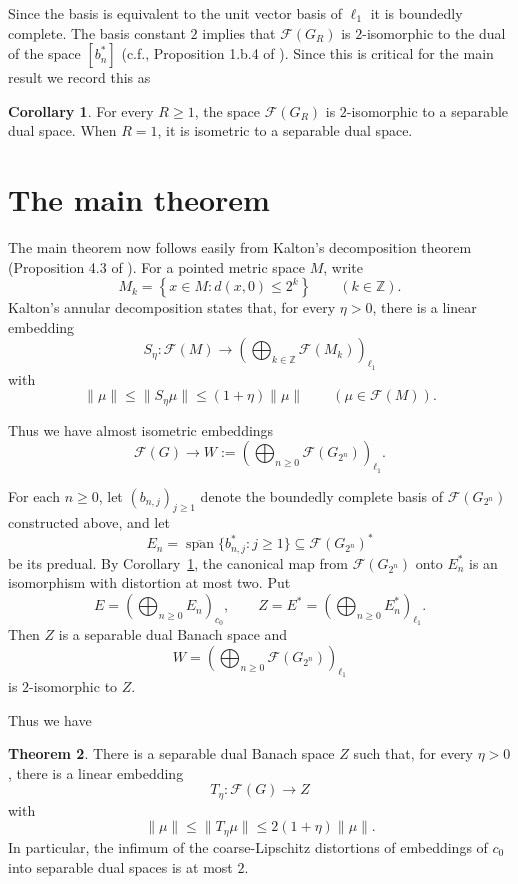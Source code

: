\documentclass[11pt]{amsart}
\theoremstyle{definition}
\newtheorem{theorem}{Theorem}
\newtheorem{corollary}[theorem]{Corollary}
\newcommand{\F}{\mathcal F}
\newcommand{\norm}[1]{\lVert#1\rVert}
\newcommand{\set}[1]{\left\{#1\right\}}
\def\Z{{\mathbb Z}}
\begin{document}
Since the basis is equivalent to the unit vector basis of $\ell_1$ it is boundedly complete. The basis constant $2$ implies that $\F(G_R)$ is $2$-isomorphic to the dual of the  space $[b^*_n]$ (c.f., Proposition 1.b.4 of \cite{LT}). Since this is critical for the main result we record this as

\begin{corollary}\label{cor:local-upper}
For every $R\geq1$, the space $\F(G_R)$ is $2$-isomorphic to a separable dual space. When $R=1$, it is isometric to a separable dual space.\end{corollary} 

\section{The main theorem}
The main theorem now follows easily from Kalton's decomposition theorem (Proposition 4.3 of \cite{Kalton2004}). For a pointed metric space $M$, write
$$
       M_k=\set{x\in M:d(x,0)\leq2^k}
       \qquad(k\in\Z).
$$
Kalton's annular decomposition states that, for every $\eta>0$, there is a
linear embedding
\begin{equation}\label{eq:kalton-decomp}
 S_\eta:\F(M)\longrightarrow
       \left(\bigoplus_{k\in\Z}\F(M_k)\right)_{\ell_1}
\end{equation}
with
\begin{equation}\label{eq:kalton-bounds}
       \norm{\mu}\leq\norm{S_\eta\mu}
       \leq(1+\eta)\norm{\mu}
       \qquad(\mu\in\F(M)).
\end{equation}

Thus we have almost isometric embeddings
$$
\F(G)\longrightarrow 
W:=\left(\bigoplus_{n\geq0}\F(G_{2^n})\right)_{\ell_1}.
$$

For each $n\geq0$, let $(b_{n,j})_{j\geq1}$ denote the boundedly complete basis of $\F(G_{2^n})$ constructed above, and let \[ E_n= \overline{\operatorname{span}}\{b_{n,j}^*:j\geq1\} \subseteq \F(G_{2^n})^* \] be its  predual. By Corollary~\ref{cor:local-upper}, the canonical map from $\F(G_{2^n})$ onto $E_n^*$ is an isomorphism with distortion at most two. Put \[ E=\left(\bigoplus_{n\geq0}E_n\right)_{c_0}, \qquad Z=E^* = \left(\bigoplus_{n\geq0}E_n^*\right)_{\ell_1}. \] Then $Z$ is a separable dual Banach space and \[ W= \left(\bigoplus_{n\geq0}\F(G_{2^n})\right)_{\ell_1} \] is $2$-isomorphic to $Z$.


Thus we have

\begin{theorem}\label{thm:global-free}
There is a separable dual Banach space $Z$ such that, for every $\eta>0$,
there is a linear embedding
$$
       T_\eta:\F(G)\longrightarrow Z
$$
with
\begin{equation}\label{eq:global-free-bounds}
       \norm{\mu}\leq\norm{T_\eta\mu}
       \leq2(1+\eta)\norm{\mu}.
\end{equation}
In particular, the infimum of the coarse-Lipschitz distortions of embeddings of $c_0$ into separable dual spaces is at most $2$.
\end{theorem}
\end{document}
